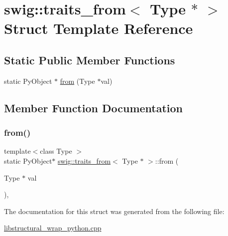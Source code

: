 \hypertarget{structswig_1_1traits__from_3_01_type_01_5_01_4}{}\section{swig\+:\+:traits\+\_\+from$<$ Type $\ast$ $>$ Struct Template Reference}
\label{structswig_1_1traits__from_3_01_type_01_5_01_4}
\subsection*{Static Public Member Functions}
\begin{DoxyCompactItemize}
\item 
static Py\+Object $\ast$ \hyperlink{structswig_1_1traits__from_3_01_type_01_5_01_4_a9df365d214884ed1c08f71211f5925ad}{from} (Type $\ast$val)
\end{DoxyCompactItemize}


\subsection{Member Function Documentation}
\mbox{\label{structswig_1_1traits__from_3_01_type_01_5_01_4_a9df365d214884ed1c08f71211f5925ad}} 
\subsubsection{\texorpdfstring{from()}{from()}}
{\footnotesize\ttfamily template$<$class Type $>$ \\
static Py\+Object$\ast$ \hyperlink{structswig_1_1traits__from}{swig\+::traits\+\_\+from}$<$ Type $\ast$ $>$\+::from (\begin{DoxyParamCaption}\item[{Type $\ast$}]{val }\end{DoxyParamCaption})\hspace{0.3cm}{\ttfamily [inline]}, {\ttfamily [static]}}



The documentation for this struct was generated from the following file\+:\begin{DoxyCompactItemize}
\item 
\hyperlink{libstructural__wrap__python_8cpp}{libstructural\+\_\+wrap\+\_\+python.\+cpp}\end{DoxyCompactItemize}
